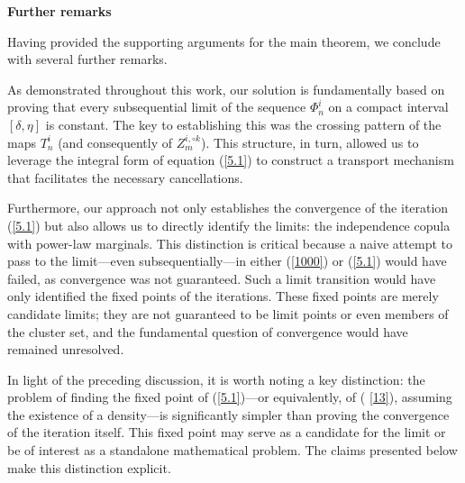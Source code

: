 \documentclass[onecolumn]{article}
\begin{document}
\begin{flushleft}
\textbf{Further remarks}
\end{flushleft}

Having provided the supporting arguments for the main theorem, we conclude
with several further remarks.

As demonstrated throughout this work, our solution is fundamentally based on
proving that every subsequential limit of the sequence $\Phi _{n}^{i}$ on a
compact interval $[\delta ,\eta ]$ is constant. The key to establishing this
was the crossing pattern of the maps $T_{n}^{i}$ (and consequently of $%
Z_{m}^{i,\circ k}$). This structure, in turn, allowed us to leverage the
integral form of equation (\ref{5.1}) to construct a transport mechanism
that facilitates the necessary cancellations.

Furthermore, our approach not only establishes the convergence of the
iteration (\ref{5.1}) but also allows us to directly identify the limits:
the independence copula with power-law marginals. This distinction is
critical because a naive attempt to pass to the limit---even
subsequentially---in either (\ref{1000}) or (\ref{5.1}) would have failed,
as convergence was not guaranteed. Such a limit transition would have only
identified the fixed points of the iterations. These fixed points are merely
candidate limits; they are not guaranteed to be limit points or even members
of the cluster set, and the fundamental question of convergence would have
remained unresolved.

In light of the preceding discussion, it is worth noting a key distinction:
the problem of finding the fixed point of (\ref{5.1})---or equivalently, of (%
\ref{13}), assuming the existence of a density---is significantly simpler
than proving the convergence of the iteration itself. This fixed point may
serve as a candidate for the limit or be of interest as a standalone
mathematical problem. The claims presented below make this distinction
explicit.
\end{document}
